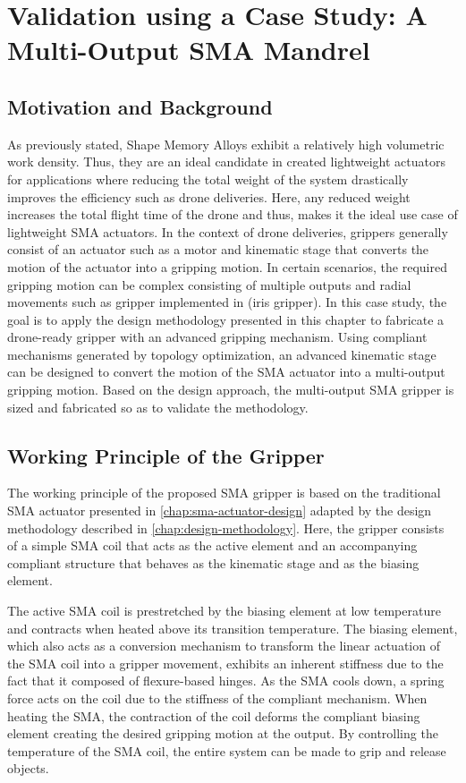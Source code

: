 \section{Validation using a Case Study: A Multi-Output SMA Mandrel}\label{sec:smacm-mandrel}
\subsection{Motivation and Background}
As previously stated, Shape Memory Alloys exhibit a relatively high volumetric work density. Thus, they are an ideal candidate in created lightweight actuators for applications where reducing the total weight of the system drastically improves the efficiency such as drone deliveries. Here, any reduced weight increases the total flight time of the drone and thus, makes it the ideal use case of lightweight SMA actuators.
In the context of drone deliveries, grippers generally consist of an actuator such as a motor and kinematic stage that converts the motion of the actuator into a gripping motion. In certain scenarios, the required gripping motion can be complex consisting of multiple outputs and radial movements such as gripper implemented in \todocite (iris gripper).
In this case study, the goal is to apply the design methodology presented in this chapter to fabricate a drone-ready gripper with an advanced gripping mechanism. Using compliant mechanisms generated by topology optimization, an advanced kinematic stage can be designed to convert the motion of the SMA actuator into a multi-output gripping motion. Based on the design approach, the multi-output SMA gripper is sized and fabricated so as to validate the methodology.
\subsection{Working Principle of the Gripper}
The working principle of the proposed SMA gripper is based on the traditional SMA actuator presented in \cref{chap:sma-actuator-design} adapted by the design methodology described in \cref{chap:design-methodology}. Here, the gripper consists of a simple SMA coil that acts as the active element and an accompanying compliant structure that behaves as the kinematic stage and as the biasing element.

The active SMA coil is prestretched by the biasing element at low temperature and contracts when heated above its transition temperature. The biasing element, which also acts as a conversion mechanism to transform the linear actuation of the SMA coil into a gripper movement, exhibits an inherent stiffness due to the fact that it composed of flexure-based hinges. As the SMA cools down, a spring force acts on the coil due to the stiffness of the compliant mechanism. When heating the SMA, the contraction of the coil deforms the compliant biasing element creating the desired gripping motion at the output. By controlling the temperature of the SMA coil, the entire system can be made to grip and release objects.

